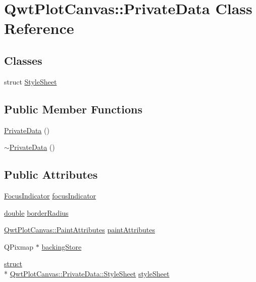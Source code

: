 \hypertarget{class_qwt_plot_canvas_1_1_private_data}{\section{Qwt\-Plot\-Canvas\-:\-:Private\-Data Class Reference}
\label{class_qwt_plot_canvas_1_1_private_data}
}
\subsection*{Classes}
\begin{DoxyCompactItemize}
\item 
struct \hyperlink{struct_qwt_plot_canvas_1_1_private_data_1_1_style_sheet}{Style\-Sheet}
\end{DoxyCompactItemize}
\subsection*{Public Member Functions}
\begin{DoxyCompactItemize}
\item 
\hyperlink{class_qwt_plot_canvas_1_1_private_data_a99c436700e14b46d41c61ea7f7b61542}{Private\-Data} ()
\item 
\hyperlink{class_qwt_plot_canvas_1_1_private_data_a8e5ea8acfed2bf23b8c96d07c6e082df}{$\sim$\-Private\-Data} ()
\end{DoxyCompactItemize}
\subsection*{Public Attributes}
\begin{DoxyCompactItemize}
\item 
\hyperlink{class_qwt_plot_canvas_a89b44e4c28038a674ce211fe9ac2d7be}{Focus\-Indicator} \hyperlink{class_qwt_plot_canvas_1_1_private_data_a4d62d449443eb4da9141e25d2b4755a9}{focus\-Indicator}
\item 
\hyperlink{_super_l_u_support_8h_a8956b2b9f49bf918deed98379d159ca7}{double} \hyperlink{class_qwt_plot_canvas_1_1_private_data_a2cb52e9259169c165196465044e1c09a}{border\-Radius}
\item 
\hyperlink{class_qwt_plot_canvas_ac007a0126efb62443e52905d3157102d}{Qwt\-Plot\-Canvas\-::\-Paint\-Attributes} \hyperlink{class_qwt_plot_canvas_1_1_private_data_a21dad4d3dc78b9fb3af836d6256cbb1d}{paint\-Attributes}
\item 
Q\-Pixmap $\ast$ \hyperlink{class_qwt_plot_canvas_1_1_private_data_a8ecdec2b2e54e97186757722f28e5169}{backing\-Store}
\item 
\hyperlink{sdlgamepad_8dox_aba655c5729da86df745f0c8e7f9ba8d2}{struct} \\*
\hyperlink{struct_qwt_plot_canvas_1_1_private_data_1_1_style_sheet}{Qwt\-Plot\-Canvas\-::\-Private\-Data\-::\-Style\-Sheet} \hyperlink{class_qwt_plot_canvas_1_1_private_data_ada23d2b403df6a5880cafce89ad35a54}{style\-Sheet}
\end{DoxyCompactItemize}


